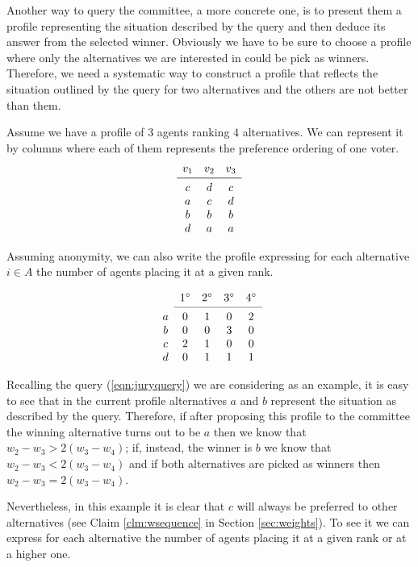 Another way to query the committee, a more concrete one, is to present them a profile representing the situation described by the query and then deduce its answer from the selected winner. Obviously we have to be sure to choose a profile where only the alternatives we are interested in could be pick as winners. Therefore, we need a systematic way to construct a profile that reflects the situation outlined by the query for two alternatives and the others are not better than them.


Assume we have a profile of $3$ agents ranking $4$ alternatives. We can represent it by columns where each of them represents the preference ordering of one voter.
\[
\begin{array}{ccc}
v_1
& v_2
& v_3 \\
\midrule 
c
& d
& c \\
a
& c
& d \\
b
& b
& b \\
d
& a
& a \\
\end{array}
\]

Assuming anonymity, we can also write the profile expressing for each alternative $i \in A$ the number of agents placing it at a given rank.

\[
\begin{array}{ccccc}
& 1^\circ
& 2^\circ
& 3^\circ
& 4^\circ \\
\cmidrule{2-5}
a 
& 0
& 1
& 0
& 2 \\
b
& 0
& 0
& 3
& 0 \\
c
& 2
& 1
& 0
& 0 \\
d
& 0
& 1
& 1
& 1 \\
\end{array}
\]

Recalling the query (\ref{eqn:juryquery}) we are considering as an example, it is easy to see that in the current profile alternatives $a$ and $b$ represent the situation as described by the query. Therefore, if after proposing this profile to the committee the winning alternative turns out to be $a$ then we know that $w_{2} - w_{3} > 2(w_{3} - w_{4})$; if, instead, the winner is $b$ we know that $w_{2} - w_{3} < 2(w_{3} - w_{4})$ and if both alternatives are picked as winners then $w_{2} - w_{3} = 2(w_{3} - w_{4})$. 

Nevertheless, in this example it is clear that $c$ will always be preferred to other alternatives (see Claim \ref{clm:wsequence} in Section \ref{sec:weights}). To see it we can express for each alternative the number of agents placing it at a given rank or at a higher one.

